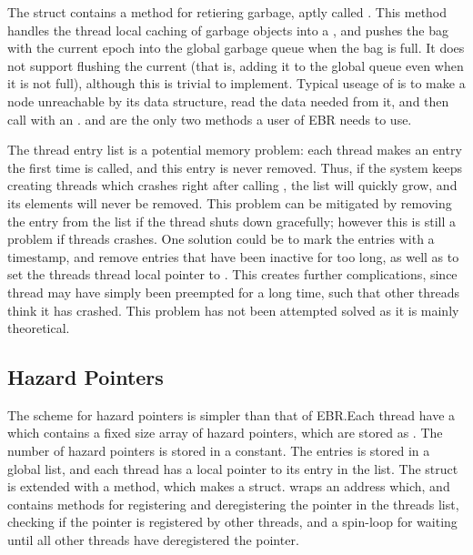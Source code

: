 \documentclass[b5paper]{report}
\begin{document}
The  struct contains a method for retiering garbage, aptly called
. This method handles the thread local caching of garbage
objects into a , and pushes the bag with the current epoch into the
global garbage queue when the bag is full. It does not support flushing the
current  (that is, adding it to the global queue even when it is not
full), although this is trivial to implement.  Typical useage of  is to make a
node unreachable by its data structure, read the data needed from it, and then
call  with an .   and
 are the only two methods a user of EBR needs to use.

The thread entry list is a potential memory problem: each thread makes an entry
the first time  is called, and this entry is never removed. Thus, if
the system keeps creating threads which crashes right after calling ,
the list will quickly grow, and its elements will never be removed. This problem
can be mitigated by removing the entry from the list if the thread shuts down
gracefully; however this is still a problem if threads crashes. One solution
could be to mark the entries with a timestamp, and remove entries that have been
inactive for too long, as well as to set the threads thread local pointer to
. This creates further complications, since thread may have simply
been preempted for a long time, such that other threads think it has crashed.
This problem has not been attempted solved as it is mainly theoretical.

\subsection{Hazard Pointers}

The scheme for hazard pointers is simpler than that of EBR.\@ Each thread have a
 which contains a fixed size array of hazard pointers, which
are stored as . The number of hazard pointers is stored in a
constant. The entries is stored in a global list, and each thread has a local
pointer to its entry in the list.  The  struct is extended with a
 method, which makes a  struct.  
wraps an address which, and contains methods for registering and deregistering
the pointer in the threads list, checking if the pointer is registered by other
threads, and a spin-loop for waiting until all other threads have deregistered
the pointer.
\end{document}
